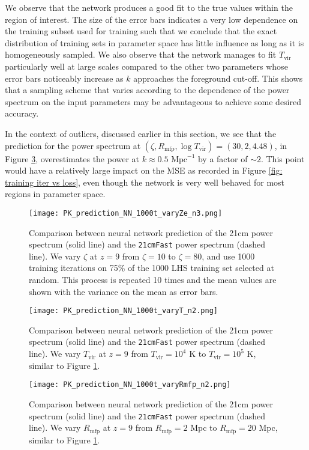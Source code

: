 \documentclass[useAMS,usenatbib]{mnras}
\begin{document}
We observe that the network produces a good fit to the true values within the region of interest.
The size of the error bars indicates a very low dependence on the training subset used for training such that we conclude that the exact distribution of training sets in parameter space has little influence as long as it is homogeneously sampled.
We also observe that the network manages to fit $T_\text{vir}$ particularly well at large scales compared to the other two parameters whose error bars noticeably increase as $k$ approaches the foreground cut-off.
This shows that a sampling scheme that varies according to the dependence of the power spectrum on the input parameters may be advantageous to achieve some desired accuracy.


In the context of outliers, discussed earlier in this section, we see that the prediction for the power spectrum at $(\zeta, R_\text{mfp}, \log T_\text{vir}) = (30, 2, 4.48)$, in Figure \ref{fig: ANN pred 3}, overestimates the power at $k \approx 0.5 \text{ Mpc}^{-1}$ by a factor of $\sim 2$.
This point would have a relatively large impact on the MSE as recorded in Figure \ref{fig: training iter vs loss}, even though the network is very well behaved for most regions in parameter space. 

\begin{figure}
\texttt{[image: PK\_prediction\_NN\_1000t\_varyZe\_n3.png]}
\caption{Comparison between neural network prediction of the 21cm power spectrum (solid line) and the \texttt{21cmFast} power spectrum (dashed line). We vary $\zeta$ at $z = 9$ from $\zeta = 10$ to $\zeta = 80$, and use 1000 training iterations on 75\% of the 1000 LHS training set selected at random. This process is repeated 10 times and the mean values are shown with the variance on the mean as error bars.}
\label{fig: ANN pred 1}
\end{figure}
\begin{figure}
\texttt{[image: PK\_prediction\_NN\_1000t\_varyT\_n2.png]}
\caption{Comparison between neural network prediction of the 21cm power spectrum (solid line) and the \texttt{21cmFast} power spectrum (dashed line). We vary $T_\text{vir}$ at $z = 9$ from $T_\text{vir}= 10^4$ K to $T_\text{vir} = 10^5$ K, similar to Figure \ref{fig: ANN pred 1}.}
\label{fig: ANN pred 2}
\end{figure}
\begin{figure}
\texttt{[image: PK\_prediction\_NN\_1000t\_varyRmfp\_n2.png]}
\caption{Comparison between neural network prediction of the 21cm power spectrum (solid line) and the \texttt{21cmFast} power spectrum (dashed line). We vary $R_\text{mfp}$ at $z = 9$ from $R_\text{mfp}= 2$ Mpc to $R_\text{mfp} = 20$ Mpc, similar to Figure \ref{fig: ANN pred 1}.}
\label{fig: ANN pred 3}
\end{figure}
\end{document}
